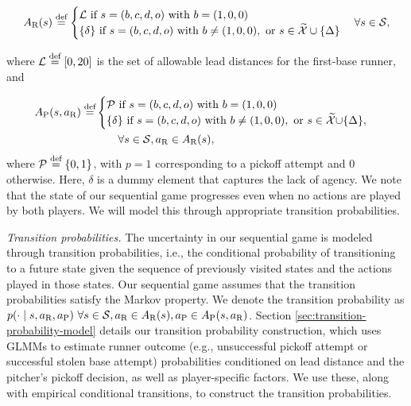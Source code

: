 \documentclass[aoas]{imsart}
\newcommand{\defeq}{\stackrel{\text{def}}{=}}
\begin{document}
    \begin{align}
    \label{eqn:runner_action_space}
        A_\text{R}(s) \defeq \begin{cases}
            {\cal L} \text{ if } s = (b,c,d,o) \text{ with } b = (1,0,0)\\
            \{\delta\} \text{ if } s = (b,c,d,o) \text{ with } b \neq (1,0,0), \text{ or } s \in \widetilde{\cal X} \cup \{\Delta\}
        \end{cases} \forall s \in {\cal S},
    \end{align}
        
    where ${\cal L} \defeq [0,20]$ is the set of allowable lead distances for the first-base runner, and
    
    \begin{align}
      \label{eqn:pitcher_action_space}
      \begin{split}
        A_{\text{P}}(s,a_\text{R}) \defeq&
        \begin{cases}
          {\cal P} \text{ if } s = (b,c,d,o) \text{ with } b = (1,0,0) \\
          \{\delta\} \text{ if } s = (b,c,d,o) \text{ with } b \neq (1,0,0), \text{ or } s \in \widetilde{\cal X} {\cup} \{\Delta\},
        \end{cases}\\
        & \qquad \forall s \in {\cal S}, a_\text{R} \in A_\text{R}(s),
      \end{split}
    \end{align} 
    where ${\cal P} \defeq \{0,1\}$, with $p = 1$ corresponding to a pickoff attempt and $0$ otherwise.  Here, $\delta$ is a dummy element that captures the lack of agency. We note that the state of our sequential game progresses even when no actions are played by both players. We will model this through appropriate transition probabilities.  

    \textit{Transition probabilities.} The uncertainty in our sequential game is modeled through transition probabilities, i.e., the conditional probability of transitioning to a future state given the sequence of previously visited states and the actions played in those states. Our sequential game assumes that the transition probabilities satisfy the Markov property. We denote the transition probability as $p(\cdot \mid s,a_\text{R},a_\text{P}) \ \forall s \in {\cal S}, a_\text{R} \in A_\text{R}(s), a_\text{P} \in A_\text{P}(s,a_\text{R})$. Section \ref{sec:transition-probability-model} details our transition probability construction, which uses GLMMs to estimate runner outcome (e.g., unsuccessful pickoff attempt or successful stolen base attempt) probabilities conditioned on lead distance and the pitcher's pickoff decision, as well as player-specific factors. We use these, along with empirical conditional transitions, to construct the transition probabilities.
\end{document}
